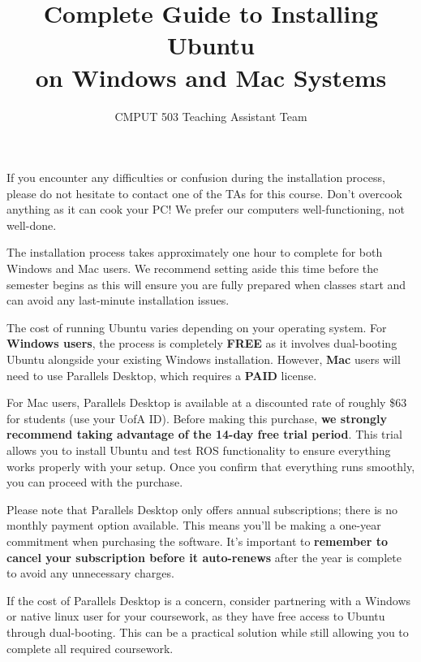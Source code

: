 \documentclass[11pt,a4paper]{article}
\begin{document}
\title{\textbf{Complete Guide to Installing Ubuntu \\
on Windows and Mac Systems}}
\author{CMPUT 503 Teaching Assistant Team}

\maketitle

\tableofcontents
\newpage

\begin{tcolorbox}[colback=yellow!10,colframe=orange!50!black,title=\textbf{Important Disclaimer}]
If you encounter any difficulties or confusion during the installation process, please do not hesitate to contact one of the TAs for this course. Don't overcook anything as it can cook your PC! We prefer our computers well-functioning, not well-done. 

The installation process takes approximately one hour to complete for both Windows and Mac users. We recommend setting aside this time before the semester begins as this will ensure you are fully prepared when classes start and can avoid any last-minute installation issues.
\end{tcolorbox}

\begin{tcolorbox}[colback=blue!10,colframe=blue!50!black,title=\textbf{Cost Information}]
The cost of running Ubuntu varies depending on your operating system. For \textbf{Windows users}, the process is completely \textbf{FREE} as it involves dual-booting Ubuntu alongside your existing Windows installation. However, \textbf{Mac} users will need to use Parallels Desktop, which requires a \textbf{PAID} license.

For Mac users, Parallels Desktop is available at a discounted rate of roughly \$63 for students (use your UofA ID). Before making this purchase, \textbf{we strongly recommend taking advantage of the 14-day free trial period}. This trial allows you to install Ubuntu and test ROS functionality to ensure everything works properly with your setup. Once you confirm that everything runs smoothly, you can proceed with the purchase.

Please note that Parallels Desktop only offers annual subscriptions; there is no monthly payment option available. This means you'll be making a one-year commitment when purchasing the software. It's important to \textbf{remember to cancel your subscription before it auto-renews} after the year is complete to avoid any unnecessary charges.

If the cost of Parallels Desktop is a concern, consider partnering with a Windows or native linux user for your coursework, as they have free access to Ubuntu through dual-booting. This can be a practical solution while still allowing you to complete all required coursework. 
\end{tcolorbox}
\end{document}
